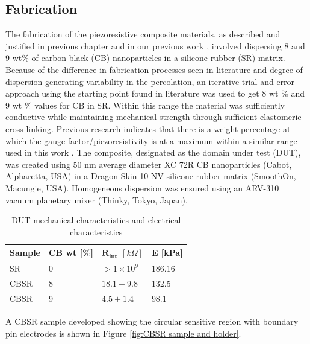 \subsection{Fabrication} \label{sec:Fabrication}
The fabrication of the piezoresistive composite materials, as described and justified in previous chapter and in our previous work \citep{Ellingham2021}, involved dispersing 8 and 9 wt\% of carbon black (CB) nanoparticles in a silicone rubber (SR) matrix. Because of the difference in fabrication processes seen in literature \cite{D'Asaro2017, Shang2016} and degree of dispersion generating variability in the percolation, an iterative trial and error approach using the starting point found in literature was used to get 8 wt \% and 9 wt \% values for CB in SR. Within this range the material was sufficiently conductive while maintaining mechanical strength through sufficient elastomeric cross-linking. Previous research indicates that there is a weight percentage at which the gauge-factor/piezoresistivity is at a maximum within a similar range used in this work \cite{Dong2017, Yang2020}. The composite, designated as the domain under test (DUT), was created using 50 nm average diameter XC 72R CB nanoparticles (Cabot, Alpharetta, USA) in a Dragon Skin 10 NV silicone rubber matrix (SmoothOn, Macungie, USA). Homogeneous dispersion was ensured using an ARV-310 vacuum planetary mixer (Thinky, Tokyo, Japan).
\begin{table}[H]
\caption{DUT mechanical characteristics and electrical characteristics}
\label{table:DUT_char}
\begin{center}
\begin{tabular}{llll}
\hline
\textbf{Sample}            & \textbf{CB wt} {[}\%{]}    & $\mathbf{R_{int}}$ $[k\Omega]$ & \textbf{E} {[}kPa{]}\\ \hline%
SR        & 0        &         $>1\times10^9$        &       186.16\\
CBSR        & 8        &         $18.1\pm9.8$          &       132.5\\
CBSR        & 9        &         $4.5\pm1.4$           &       98.1\\
\hline
\end{tabular}
\end{center}
\end{table}
A CBSR sample developed showing the circular sensitive region with boundary pin electrodes is shown in Figure \ref{fig:CBSR sample and holder}.
